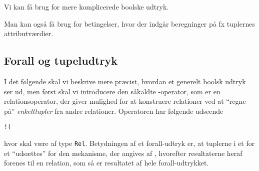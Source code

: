 \documentclass{article}
\newcounter{eks}
\begin{document}
Vi kan f\aa{} brug for mere komplicerede boolske udtryk.
\newpage
{}

Man kan ogs\aa{} f\aa{} brug for betingelser, hvor der indg\aa{}r 
beregninger p\aa{} fx tuplernes attributv\ae{}rdier.


\subsection{Forall og tupeludtryk}
I det f\o{}lgende skal vi beskrive mere pr\ae{}cist, hvordan et generelt
boolsk udtryk ser ud, men f\o{}rst skal vi introducere den
s\aa{}kaldte {\em {}}-operator, som er en relationsoperator, der
giver mulighed for at konstruere relationer ved at ``regne p\aa{}''
{\em enkelttupler\/} fra andre relationer. Operatoren har f\o{}lgende
udseende
\begin{center}
{\tt !(} 
\end{center}
hvor  skal v\ae{}re af type \verb"Rel". Betydningen af
et forall-udtryk er, at tuplerne i  et for et
``uds\ae{}ttes'' for den mekanisme, der angives af ,
hvorefter resultaterne heraf forenes til en relation, som s\aa{} er
resultatet af hele forall-udtrykket.
\end{document}
